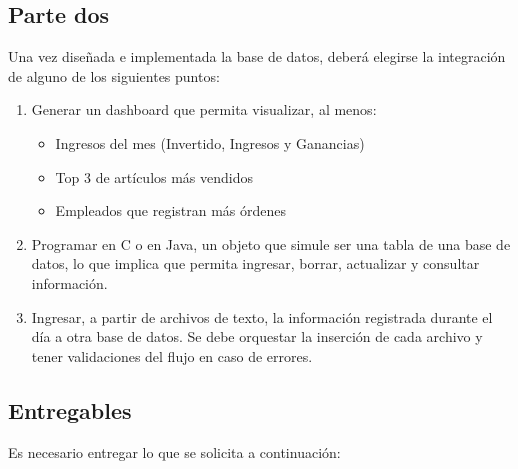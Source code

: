 \documentclass[10pt,openany]{book}
\begin{document}
\subsection{Parte dos}
Una vez diseñada e implementada la base de datos, deberá elegirse la integración de alguno de los siguientes puntos:
\begin{enumerate}
    \item Generar un dashboard que permita visualizar, al menos:
    \begin{itemize}
        \item Ingresos del mes (Invertido, Ingresos y Ganancias)
        \item Top 3 de artículos más vendidos
        \item Empleados que registran más órdenes
    \end{itemize}
    \item Programar en C o en Java, un objeto que simule ser una tabla de una base de datos, lo que implica que permita ingresar, borrar, actualizar y consultar información.
    \item Ingresar, a partir de archivos de texto, la información registrada durante el día a otra base de datos. Se debe orquestar la inserción de cada archivo y tener validaciones del flujo en caso de errores.
\end{enumerate}

\subsection{Entregables}
Es necesario entregar lo que se solicita a continuación:
\end{document}
